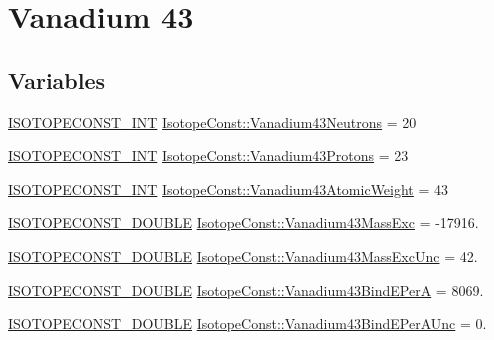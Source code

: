 \hypertarget{group___isotope_const-_vanadium-_v43}{}\section{Vanadium 43}
\label{group___isotope_const-_vanadium-_v43}
\subsection*{Variables}
\begin{DoxyCompactItemize}
\item 
\mbox{\hyperlink{group___isotope_const-_macros_ga5f18360b3e99483a35c32d789e62621c}{I\+S\+O\+T\+O\+P\+E\+C\+O\+N\+S\+T\+\_\+\+I\+NT}} \mbox{\hyperlink{group___isotope_const-_vanadium-_v43_gaf23f33d85458c4dbb946d03d06de6e5e}{Isotope\+Const\+::\+Vanadium43\+Neutrons}} = 20
\item 
\mbox{\hyperlink{group___isotope_const-_macros_ga5f18360b3e99483a35c32d789e62621c}{I\+S\+O\+T\+O\+P\+E\+C\+O\+N\+S\+T\+\_\+\+I\+NT}} \mbox{\hyperlink{group___isotope_const-_vanadium-_v43_ga1879c45f46ea09e5194ff22a55c1ef07}{Isotope\+Const\+::\+Vanadium43\+Protons}} = 23
\item 
\mbox{\hyperlink{group___isotope_const-_macros_ga5f18360b3e99483a35c32d789e62621c}{I\+S\+O\+T\+O\+P\+E\+C\+O\+N\+S\+T\+\_\+\+I\+NT}} \mbox{\hyperlink{group___isotope_const-_vanadium-_v43_ga05f43f354b55778624af871d9416fe78}{Isotope\+Const\+::\+Vanadium43\+Atomic\+Weight}} = 43
\item 
\mbox{\hyperlink{group___isotope_const-_macros_ga8f45a7272ce02c0b4c65c44636ed719a}{I\+S\+O\+T\+O\+P\+E\+C\+O\+N\+S\+T\+\_\+\+D\+O\+U\+B\+LE}} \mbox{\hyperlink{group___isotope_const-_vanadium-_v43_ga7f5ea7abcde9ce31f4c35e0674bee7fe}{Isotope\+Const\+::\+Vanadium43\+Mass\+Exc}} = -\/17916.
\item 
\mbox{\hyperlink{group___isotope_const-_macros_ga8f45a7272ce02c0b4c65c44636ed719a}{I\+S\+O\+T\+O\+P\+E\+C\+O\+N\+S\+T\+\_\+\+D\+O\+U\+B\+LE}} \mbox{\hyperlink{group___isotope_const-_vanadium-_v43_ga4092cdc4b19ca35ecbd253fbdaca520b}{Isotope\+Const\+::\+Vanadium43\+Mass\+Exc\+Unc}} = 42.
\item 
\mbox{\hyperlink{group___isotope_const-_macros_ga8f45a7272ce02c0b4c65c44636ed719a}{I\+S\+O\+T\+O\+P\+E\+C\+O\+N\+S\+T\+\_\+\+D\+O\+U\+B\+LE}} \mbox{\hyperlink{group___isotope_const-_vanadium-_v43_ga5b7fd6d78f5075cd086246c35e7e9dce}{Isotope\+Const\+::\+Vanadium43\+Bind\+E\+PerA}} = 8069.
\item 
\mbox{\hyperlink{group___isotope_const-_macros_ga8f45a7272ce02c0b4c65c44636ed719a}{I\+S\+O\+T\+O\+P\+E\+C\+O\+N\+S\+T\+\_\+\+D\+O\+U\+B\+LE}} \mbox{\hyperlink{group___isotope_const-_vanadium-_v43_gafc237a16503b04bd71c5363beb6d12d9}{Isotope\+Const\+::\+Vanadium43\+Bind\+E\+Per\+A\+Unc}} = 0.

\end{DoxyCompactItemize}
